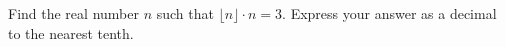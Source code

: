 Find the real number $n$ such that $\lfloor n\rfloor\cdot n=3$. Express your answer as a decimal to the nearest tenth.
